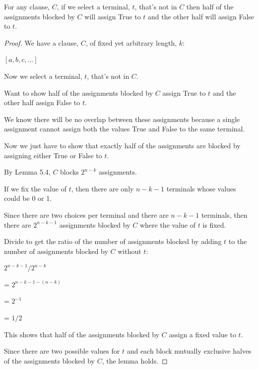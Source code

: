 \documentclass[manuscript]{acmart}
\begin{document}
    \begin{lemma}
        For any clause, $C$, if we select a terminal, $t$, that's not in $C$ then half of the assignments blocked by $C$ will assign True to $t$ and the other half will assign 
        False to $t$.
    \end{lemma}
    \begin{proof}
        We have a clause, $C$, of fixed yet arbitrary length, $k$:

        $[a, b, c, ...]$

        Now we select a terminal, $t$, that's not in $C$.

        Want to show half of the assignments blocked by $C$ assign True to $t$ and the other half assign False to $t$.

        We know there will be no overlap between these assignments because a single assignment cannot assign both the values True and False to the same terminal.

        Now we just have to show that exactly half of the assignments are blocked by assigning either True or False to $t$.

        By Lemma 5.4, $C$ blocks $2^{n-k}$ assignments. 

        If we fix the value of $t$, then there are only $n-k-1$ terminals whose values could be 0 or 1. 
        
        Since there are two choices per terminal and there are $n-k-1$ terminals, then there are $2^{n-k-1}$ assignments blocked by $C$ where the value of $t$ is fixed.

        Divide to get the ratio of the number of assignments blocked by adding $t$ to the number of assignments blocked by $C$ without $t$:
        
        $2^{n-k-1}/2^{n-k}$

        = $2^{n - k - 1 - (n - k)}$

        = $2^{-1}$

        = $1/2$

        This shows that half of the assignments blocked by $C$ assign a fixed value to $t$.

        Since there are two possible values for $t$ and each block mutually exclusive halves of the assignments blocked by $C$, the lemma holds.
    \end{proof}
\end{document}
